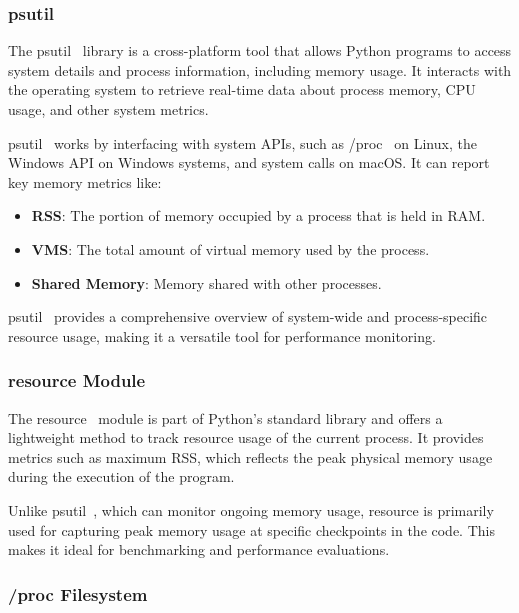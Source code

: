 \subsubsection{psutil}

The psutil~\cite{psutil} library is a cross-platform tool that allows Python programs to access system details and process information, including memory usage.
It interacts with the operating system to retrieve real-time data about process memory, CPU usage, and other system metrics.

psutil~\cite{psutil} works by interfacing with system APIs, such as /proc~\cite{procfs} on Linux, the Windows API on Windows systems, and system calls on macOS.
It can report key memory metrics like:

\begin{itemize}
    \item \textbf{\ac{RSS}}:
    The portion of memory occupied by a process that is held in RAM.

    \item \textbf{\ac{VMS}}:
    The total amount of virtual memory used by the process.

    \item \textbf{Shared Memory}:
    Memory shared with other processes.
\end{itemize}

psutil~\cite{psutil} provides a comprehensive overview of system-wide and process-specific resource usage, making it a versatile tool for performance monitoring.

\subsubsection{resource Module}

The resource~\cite{importlib_resources} module is part of Python's standard library and offers a lightweight method to track resource usage of the current process.
It provides metrics such as maximum \ac{RSS}, which reflects the peak physical memory usage during the execution of the program.

Unlike psutil~\cite{psutil}, which can monitor ongoing memory usage, resource is primarily used for capturing peak memory usage at specific checkpoints in the code.
This makes it ideal for benchmarking and performance evaluations.

\subsubsection{/proc Filesystem}

